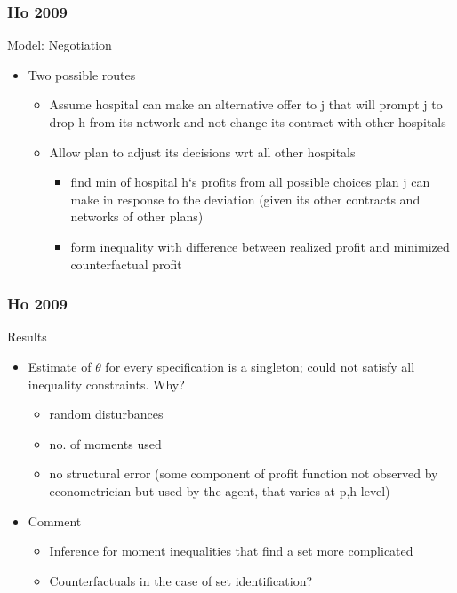 \documentclass[aspectratio=169,11pt]{beamer}
\begin{document}
\begin{frame}
\frametitle{Ho 2009}

Model: Negotiation
\begin{itemize}
\item Two possible routes
\begin{itemize}
\item Assume hospital can make an alternative offer to j that will prompt j to drop h from its network and not change its contract with other hospitals
\item Allow plan to adjust its decisions wrt all other hospitals
\begin{itemize}
\item find min of hospital h`s profits from all possible choices plan j can make in response to the deviation (given its other contracts and networks of other plans)
\item form inequality with difference between realized profit and minimized counterfactual profit
\end{itemize}

\end{itemize}
\end{itemize}

\end{frame}

\begin{frame}
\frametitle{Ho 2009}

Results
\begin{itemize}
\item Estimate of $\theta$ for every specification is a singleton; could not satisfy all inequality constraints.  Why?
\begin{itemize}
\item random disturbances
\item no. of moments used
\item no structural error (some component of profit function not observed by econometrician but used by the agent, that varies at p,h level)
\end{itemize}
\item Comment
\begin{itemize}
\item Inference for moment inequalities that find a set more complicated
\item Counterfactuals in the case of set identification?
\end{itemize}
\end{itemize}
\end{frame}
\end{document}
